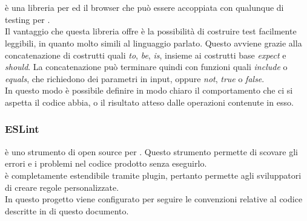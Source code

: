 \paragraph{}\mbox{}\\
 è una libreria  per  ed il browser che può essere accoppiata con qualunque  di testing per .\\
Il vantaggio che questa libreria offre è la possibilità di costruire test facilmente leggibili, in quanto molto simili al linguaggio parlato. Questo avviene grazie alla concatenazione di costrutti quali \textit{to}, \textit{be}, \textit{is}, insieme ai costrutti base \textit{expect} e \textit{should}. La concatenazione può terminare quindi con funzioni quali \textit{include} o \textit{equals}, che richiedono dei parametri in input, oppure \textit{not}, \textit{true} o \textit{false}.\\
In questo modo è possibile definire in modo chiaro il comportamento che ci si aspetta il codice abbia, o il risultato atteso dalle operazioni contenute in esso.

\subsubsection{ESLint} \label{sec:eslint}
 è uno strumento di  open source per . Questo strumento permette di scovare gli errori e i problemi nel codice prodotto senza eseguirlo.\\  è completamente estendibile tramite plugin, pertanto permette agli sviluppatori di creare regole personalizzate.\\
In questo progetto  viene configurato per seguire le convenzioni relative al codice descritte in  di questo documento.